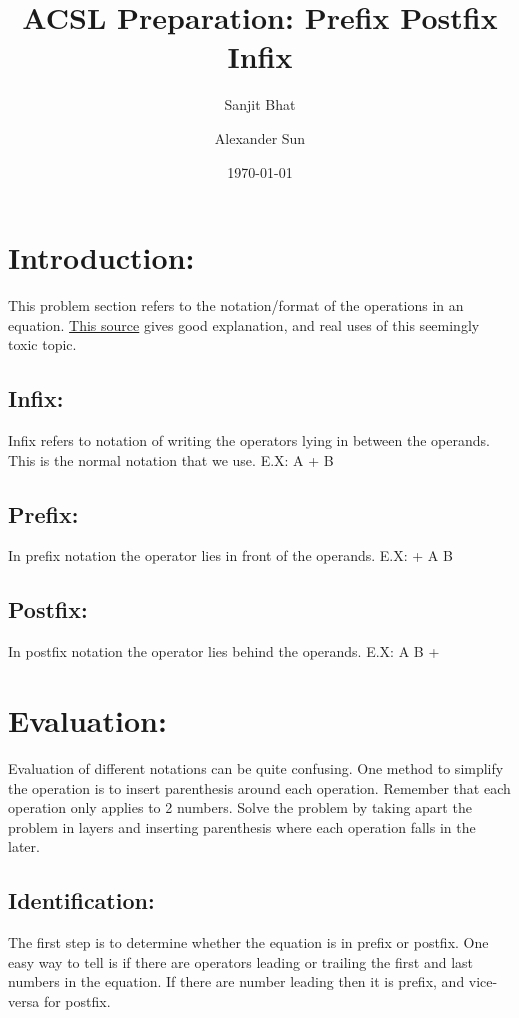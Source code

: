 \documentclass[11pt,letterpaper]{article}
\title{ACSL Preparation: Prefix Postfix Infix}
\author{Sanjit Bhat \and Alexander Sun}
\date{\today}
\begin{document}
\maketitle

\section{Introduction:}
This problem section refers to the notation/format of the operations in an equation.
\href{http://interactivepython.org/runestone/static/pythonds/BasicDS/InfixPrefixandPostfixExpressions.html}{This source} gives good explanation, and real uses of this seemingly toxic topic.

\subsection{Infix:}
Infix refers to notation of writing the operators lying in between the operands. This is the normal notation that we use. E.X: A + B

\subsection{Prefix:}
In prefix notation the operator lies in front of the operands. E.X: + A B

\subsection{Postfix:}
In postfix notation the operator lies behind the operands. E.X: A B +

\section{Evaluation:}
Evaluation of different notations can be quite confusing. One method to simplify the operation is to insert parenthesis around each operation. Remember that each operation only applies to 2 numbers. Solve the problem by taking apart the problem in layers and inserting parenthesis where each operation falls in the later. 

\subsection{Identification:}
The first step is to determine whether the equation is in prefix or postfix. One easy way to tell is if there are operators leading or trailing the first and last numbers in the equation. If there are number leading then it is prefix, and vice-versa for postfix.
\end{document}

